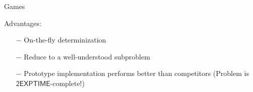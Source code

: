 \documentclass[../talk.tex]{subfiles}
\begin{document}
\begin{frame}{Games}
\begin{overlayarea}{\slidewidth}{\slideheight}
        {%
            Advantages:
            \begin{itemize}
                \item[$-$] On-the-fly determinization
                \item[$-$] Reduce to a well-understood subproblem
                \item[$-$] Prototype implementation performs better than competitors
                    (Problem is $\mathsf{2EXPTIME}$-complete!)
            \end{itemize}
        }
    \end{overlayarea}
\end{frame}
\end{document}

